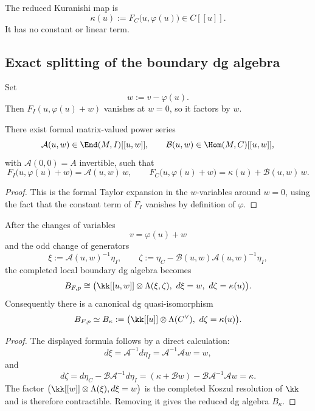 \begin{definition}
The reduced Kuranishi map is
\begin{equation}\label{eq:kappa-def}
\kappa(u):=F_C\bigl(u,\varphi(u)\bigr)\in C[[u]].
\end{equation}
It has no constant or linear term.
\end{definition}

\subsection{Exact splitting of the boundary dg algebra}

Set
\[
w:=v-\varphi(u).
\]
Then $F_I(u,\varphi(u)+w)$ vanishes at $w=0$, so it factors by $w$.

\begin{lemma}\label{lem:factorization}
There exist formal matrix-valued power series
\[
\mathcal A(u,w)\in \End(M,I)[[u,w]],
\qquad
\mathcal B(u,w)\in \Hom(M,C)[[u,w]],
\]
with $\mathcal A(0,0)=A$ invertible, such that
\[
F_I\bigl(u,\varphi(u)+w\bigr)=\mathcal A(u,w)\,w,
\qquad
F_C\bigl(u,\varphi(u)+w\bigr)=\kappa(u)+\mathcal B(u,w)\,w.
\]
\end{lemma}

\begin{proof}
This is the formal Taylor expansion in the $w$-variables around $w=0$, using the fact that the constant term of $F_I$ vanishes by definition of $\varphi$.
\end{proof}

\begin{theorem}\label{thm:boundary-kuranishi}
After the changes of variables
\[
v=\varphi(u)+w
\]
and the odd change of generators
\[
\xi:=\mathcal A(u,w)^{-1}\eta_I,
\qquad
\zeta:=\eta_C-\mathcal B(u,w)\mathcal A(u,w)^{-1}\eta_I,
\]
the completed local boundary dg algebra becomes
\[
B_{F,p}
\cong
\bigl(\kk[[u,w]]\ot \Lambda(\xi,\zeta),\ d\xi=w,\ d\zeta=\kappa(u)\bigr).
\]
Consequently there is a canonical dg quasi-isomorphism
\[
B_{F,p}\simeq B_\kappa
:=
\bigl(\kk[[u]]\ot \Lambda(C^\vee),\ d\zeta=\kappa(u)\bigr).
\]
\end{theorem}

\begin{proof}
The displayed formula follows by a direct calculation:
\[
d\xi=\mathcal A^{-1}d\eta_I=\mathcal A^{-1}\mathcal A w=w,
\]
and
\[
d\zeta=d\eta_C-\mathcal B\mathcal A^{-1}d\eta_I
=(\kappa+\mathcal Bw)-\mathcal B\mathcal A^{-1}\mathcal A w
=\kappa.
\]
The factor $\bigl(\kk[[w]]\ot \Lambda(\xi),d\xi=w\bigr)$ is the completed Koszul resolution of $\kk$ and is therefore contractible. Removing it gives the reduced dg algebra $B_\kappa$.
\end{proof}

